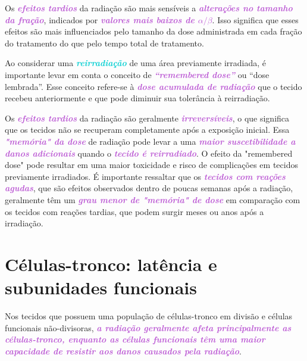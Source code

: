 \documentclass[11pt,a4paper]{article}
\begin{document}
	Os \textcolor{MediumOrchid}{\textbf{\textit{efeitos tardios}}} da radiação são mais sensíveis a\textcolor{MediumOrchid}{\textbf{\textit{ alterações no tamanho da fração}}}, indicados por \textcolor{MediumOrchid}{\textbf{\textit{valores mais baixos de $\alpha/\beta$}}}. Isso significa que esses efeitos são mais influenciados pelo tamanho da dose administrada em cada fração do tratamento do que pelo tempo total de tratamento.


	Ao considerar uma \textcolor{DarkTurquoise}{\textbf{\textit{reirradiação}}} de uma área previamente irradiada, é importante levar em conta o conceito de \textcolor{MediumOrchid}{\textbf{\textit{``remembered dose''}}} ou ``dose lembrada''. Esse conceito refere-se à \textcolor{MediumOrchid}{\textbf{\textit{dose acumulada de radiação}}} que o tecido recebeu anteriormente e que pode diminuir sua tolerância à reirradiação.

	Os \textcolor{MediumOrchid}{\textbf{\textit{efeitos tardios}}} da radiação são geralmente \textcolor{MediumOrchid}{\textbf{\textit{irreversíveis}}}, o que significa que os tecidos não se recuperam completamente após a exposição inicial. Essa \textcolor{MediumOrchid}{\textbf{\textit{"memória" da dose}}} de radiação pode levar a uma \textcolor{MediumOrchid}{\textbf{\textit{maior suscetibilidade a danos adicionais}}} quando o \textcolor{MediumOrchid}{\textbf{\textit{tecido é reirradiado}}}. O efeito da "remembered dose" pode resultar em uma maior toxicidade e risco de complicações em tecidos previamente irradiados. É importante ressaltar que os \textcolor{MediumOrchid}{\textbf{\textit{tecidos com reações agudas}}}, que são efeitos observados dentro de poucas semanas após a radiação, geralmente têm um \textcolor{MediumOrchid}{\textbf{\textit{grau menor de "memória" de dose}}} em comparação com os tecidos com reações tardias, que podem surgir meses ou anos após a irradiação.

\section{Células-tronco: latência e subunidades funcionais}

	Nos tecidos que possuem uma população de células-tronco em divisão e células funcionais não-divisoras, \textcolor{MediumOrchid}{\textbf{\textit{a radiação geralmente afeta principalmente as células-tronco, enquanto as células funcionais têm uma maior capacidade de resistir aos danos causados pela radiação}}}.
\end{document}
